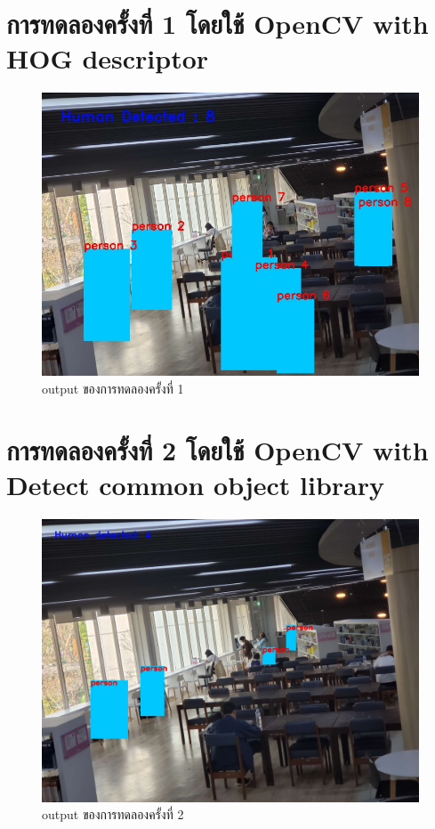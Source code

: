 \section{การทดลองครั้งที่ 1 โดยใช้ OpenCV with HOG descriptor}
\begin{figure}[ht]
\centering
\includegraphics[scale=0.35]{images/hog_output.jpg}
\caption[output1]{output ของการทดลองครั้งที่ 1}
\label{fig:output1}
\end{figure}

\section{การทดลองครั้งที่ 2 โดยใช้ OpenCV with Detect common object library}
\begin{figure}[ht]
\centering
\includegraphics[scale=0.25]{images/cvlib_output.jpg}
\caption[output2]{output ของการทดลองครั้งที่ 2}
\label{fig:output2}
\end{figure}

